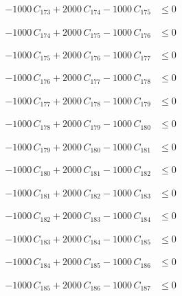 \documentclass[a4paper,11pt]{article}
\begin{document}
\begin{align}
-1000\,C_{173} + 2000\,C_{174} - 1000\,C_{175} &\leq 0 \nonumber
\end{align}

\begin{align}
-1000\,C_{174} + 2000\,C_{175} - 1000\,C_{176} &\leq 0 \nonumber
\end{align}

\begin{align}
-1000\,C_{175} + 2000\,C_{176} - 1000\,C_{177} &\leq 0 \nonumber
\end{align}

\begin{align}
-1000\,C_{176} + 2000\,C_{177} - 1000\,C_{178} &\leq 0 \nonumber
\end{align}

\begin{align}
-1000\,C_{177} + 2000\,C_{178} - 1000\,C_{179} &\leq 0 \nonumber
\end{align}

\begin{align}
-1000\,C_{178} + 2000\,C_{179} - 1000\,C_{180} &\leq 0 \nonumber
\end{align}

\begin{align}
-1000\,C_{179} + 2000\,C_{180} - 1000\,C_{181} &\leq 0 \nonumber
\end{align}

\begin{align}
-1000\,C_{180} + 2000\,C_{181} - 1000\,C_{182} &\leq 0 \nonumber
\end{align}

\begin{align}
-1000\,C_{181} + 2000\,C_{182} - 1000\,C_{183} &\leq 0 \nonumber
\end{align}

\begin{align}
-1000\,C_{182} + 2000\,C_{183} - 1000\,C_{184} &\leq 0 \nonumber
\end{align}

\begin{align}
-1000\,C_{183} + 2000\,C_{184} - 1000\,C_{185} &\leq 0 \nonumber
\end{align}

\begin{align}
-1000\,C_{184} + 2000\,C_{185} - 1000\,C_{186} &\leq 0 \nonumber
\end{align}

\begin{align}
-1000\,C_{185} + 2000\,C_{186} - 1000\,C_{187} &\leq 0 \nonumber
\end{align}
\end{document}

